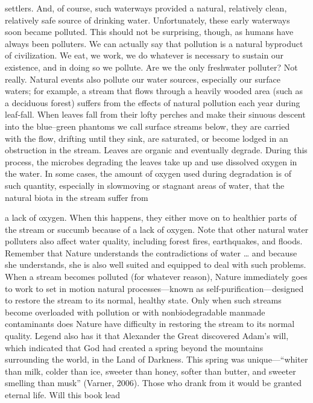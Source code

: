 \documentclass{article}
\begin{document}
settlers. And, of course, such waterways provided a natural, relatively
clean, relatively safe source of drinking water. Unfortunately, these
early waterways soon became polluted. This should not be surprising,
though, as humans have always been polluters. We can actually say that
pollution is a natural byproduct of civilization. We eat, we work, we do
whatever is necessary to sustain our existence, and in doing so we
pollute. Are we the only freshwater polluter? Not really. Natural events
also pollute our water sources, especially our surface waters; for
example, a stream that flows through a heavily wooded area (such as a
deciduous forest) suffers from the effects of natural pollution each
year during leaf-fall. When leaves fall from their lofty perches and
make their sinuous descent into the blue--green phantoms we call surface
streams below, they are carried with the flow, drifting until they sink,
are saturated, or become lodged in an obstruction in the stream. Leaves
are organic and eventually degrade. During this process, the microbes
degrading the leaves take up and use dissolved oxygen in the water. In
some cases, the amount of oxygen used during degradation is of such
quantity, especially in slowmoving or stagnant areas of water, that the
natural biota in the stream suffer from

a lack of oxygen. When this happens, they either move on to healthier
parts of the stream or succumb because of a lack of oxygen. Note that
other natural water polluters also affect water quality, including
forest fires, earthquakes, and floods. Remember that Nature understands
the contradictions of water \ldots{} and because she understands, she is
also well suited and equipped to deal with such problems. When a stream
becomes polluted (for whatever reason), Nature immediately goes to work
to set in motion natural processes---known as
self-purification---designed to restore the stream to its normal,
healthy state. Only when such streams become overloaded with pollution
or with nonbiodegradable manmade contaminants does Nature have
difficulty in restoring the stream to its normal quality. Legend also
has it that Alexander the Great discovered Adam's will, which indicated
that God had created a spring beyond the mountains surrounding the
world, in the Land of Darkness. This spring was unique---``whiter than
milk, colder than ice, sweeter than honey, softer than butter, and
sweeter smelling than musk'' (Varner, 2006). Those who drank from it
would be granted eternal life. Will this book lead
\end{document}

